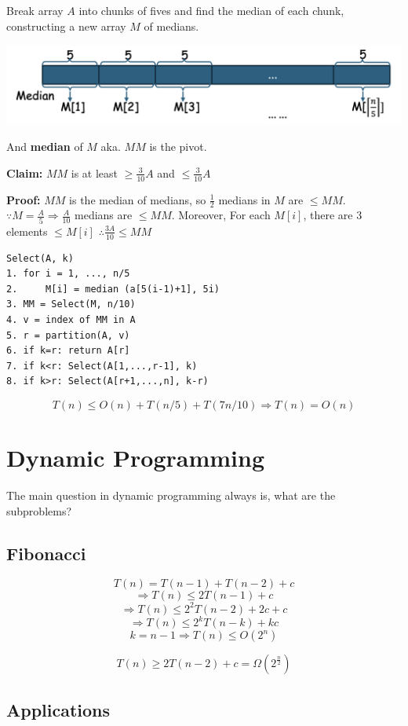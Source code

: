 \documentclass[12pt,a4paper]{article}
\begin{document}
Break array $A$ into chunks of fives and find the median of each chunk,
constructing a new array $M$ of medians.

\includegraphics[width=\textwidth]{./images/chunks_of_fives.png}

And \textbf{median} of $M$ aka. $MM$ is the pivot.

\textbf{Claim:} $MM$ is at least $\geq \frac{3}{10}A$ and $\leq \frac{3}{10}A$

\textbf{Proof:} $MM$ is the median of medians, so $\frac{1}{2}$ medians in $M$ are $\leq MM$.
$\because M = \frac{A}{5} \Rightarrow \frac{A}{10}$ medians are $\leq MM$. Moreover, 
For each $M[i]$, there are 3 elements $\leq M[i]$ $\therefore \frac{3A}{10} \leq MM$

\begin{verbatim}
Select(A, k)
1. for i = 1, ..., n/5
2.     M[i] = median (a[5(i-1)+1], 5i)
3. MM = Select(M, n/10)
4. v = index of MM in A
5. r = partition(A, v)
6. if k=r: return A[r]
7. if k<r: Select(A[1,...,r-1], k)
8. if k>r: Select(A[r+1,...,n], k-r)
\end{verbatim}

\[T(n) \leq O(n) + T(n/5) + T(7n/10) \Rightarrow T(n) = O(n)\]

\section*{Dynamic Programming}

The main question in dynamic programming always is, what are the subproblems?

\subsection*{Fibonacci}

\[T(n) = T(n-1) + T(n-2) + c\]
\[\Rightarrow T(n) \leq 2T(n-1) + c\]
\[\Rightarrow T(n) \leq 2^2T(n-2) + 2c + c\]
\[\Rightarrow T(n) \leq 2^kT(n-k) + kc\]
\[k = n - 1 \Rightarrow T(n) \leq O(2^n)\]

\[T(n) \geq 2T(n-2) + c = \Omega(2^{\frac{n}{2}})\]

\subsection*{Applications}
\end{document}
